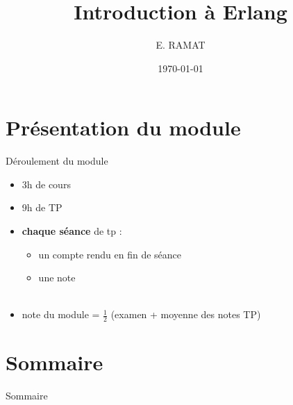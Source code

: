 \documentclass[sans, mathsans, professionalfonts, compress, smaller, table,
               xcolor=pdftex, dvipsnames]{beamer}
\title[Erlang]{Introduction à Erlang}
\subtitle{}
\author[E. Ramat]{E. RAMAT}
\institute[ULCO]{Université du Littoral - Côte d'Opale}
\date{\today}
\begin{document}
\begin{frame}
  \titlepage
\end{frame}

\section*{Présentation du module}
\begin{frame}{Déroulement du module}
  \begin{itemize}
  \item 3h de cours
  \item 9h de TP
  \item \textbf{chaque séance} de tp :
    \begin{itemize}
    \item un compte rendu en fin de séance
    \item une note\\~
    \end{itemize}
  \item note du module = ${\frac{1}{2}}$ (examen + moyenne des notes TP)
  \end{itemize}
\end{frame}

\section*{Sommaire}
\begin{frame}{Sommaire}
\tableofcontents
\end{frame}






















\end{document}
